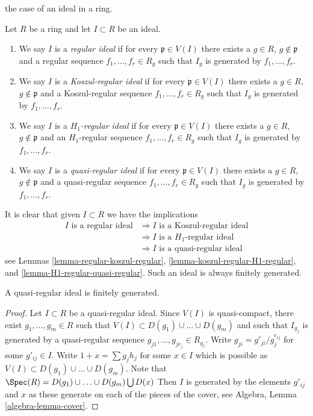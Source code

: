 the case of an ideal in a ring.

\begin{definition}
\label{definition-regular-ideal}
Let $R$ be a ring and let $I \subset R$ be an ideal.
\begin{enumerate}
\item We say $I$ is a {\it regular ideal} if for every
$\mathfrak p \in V(I)$ there exists a $g \in R$, $g \not \in \mathfrak p$
and a regular sequence $f_1, \ldots, f_r \in R_g$ such that $I_g$
is generated by $f_1, \ldots, f_r$.
\item We say $I$ is a {\it Koszul-regular ideal} if for every
$\mathfrak p \in V(I)$ there exists a $g \in R$, $g \not \in \mathfrak p$
and a Koszul-regular sequence $f_1, \ldots, f_r \in R_g$ such that $I_g$
is generated by $f_1, \ldots, f_r$.
\item We say $I$ is a {\it $H_1$-regular ideal} if for every
$\mathfrak p \in V(I)$ there exists a $g \in R$, $g \not \in \mathfrak p$
and an $H_1$-regular sequence $f_1, \ldots, f_r \in R_g$ such that $I_g$
is generated by $f_1, \ldots, f_r$.
\item We say $I$ is a {\it quasi-regular ideal} if for every
$\mathfrak p \in V(I)$ there exists a $g \in R$, $g \not \in \mathfrak p$
and a quasi-regular sequence $f_1, \ldots, f_r \in R_g$ such that $I_g$
is generated by $f_1, \ldots, f_r$.
\end{enumerate}
\end{definition}

\noindent
It is clear that given $I \subset R$ we have the implications
\begin{align*}
I\text{ is a regular ideal}
& \Rightarrow
I\text{ is a Koszul-regular ideal} \\
& \Rightarrow
I\text{ is a }H_1\text{-regular ideal} \\
& \Rightarrow
I\text{ is a quasi-regular ideal}
\end{align*}
see Lemmas \ref{lemma-regular-koszul-regular},
\ref{lemma-koszul-regular-H1-regular}, and
\ref{lemma-H1-regular-quasi-regular}. Such an ideal is always finitely
generated.

\begin{lemma}
\label{lemma-quasi-regular-ideal-finite}
A quasi-regular ideal is finitely generated.
\end{lemma}

\begin{proof}
Let $I \subset R$ be a quasi-regular ideal. Since $V(I)$ is quasi-compact,
there exist $g_1, \ldots, g_m \in R$ such that
$V(I) \subset D(g_1) \cup \ldots \cup D(g_m)$
and such that $I_{g_j}$ is generated by a quasi-regular sequence
$g_{j1}, \ldots, g_{jr_j} \in R_{g_j}$. Write $g_{ji} = g'_{ji}/g_j^{e_{ij}}$
for some $g'_{ij} \in I$. Write $1 + x = \sum g_j h_j$
for some $x \in I$ which is possible as
$V(I) \subset D(g_1) \cup \ldots \cup D(g_m)$.
Note that $\Spec(R) = D(g_1) \cup \ldots \cup D(g_m) \bigcup D(x)$
Then $I$ is generated by the elements $g'_{ij}$ and $x$ as
these generate on each of the pieces of the cover, see
Algebra, Lemma \ref{algebra-lemma-cover}.
\end{proof}

